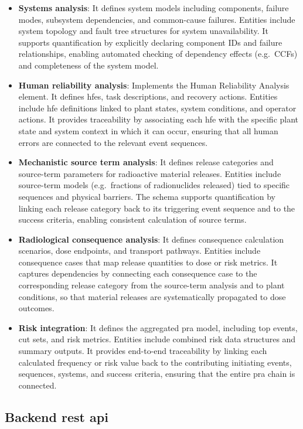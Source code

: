 \begin{itemize}
  \item \textbf{Systems analysis}: It defines system models including components, failure modes, subsystem dependencies, and common-cause failures.  Entities include system topology and fault tree structures for system unavailability.  It supports quantification by explicitly declaring component IDs and failure relationships, enabling automated checking of dependency effects (e.g.\ CCFs) and completeness of the system model.
  \item \textbf{Human reliability analysis}: Implements the Human Reliability Analysis element.  It defines \acrfull{hfe}s, task descriptions, and recovery actions.  Entities include \acrshort{hfe} definitions linked to plant states, system conditions, and operator actions.  It provides traceability by associating each \acrshort{hfe} with the specific plant state and system context in which it can occur, ensuring that all human errors are connected to the relevant event sequences.
  \item \textbf{Mechanistic source term analysis}: It defines release categories and source-term parameters for radioactive material releases.  Entities include source-term models (e.g.\ fractions of radionuclides released) tied to specific sequences and physical barriers.  The schema supports quantification by linking each release category back to its triggering event sequence and to the success criteria, enabling consistent calculation of source terms.
  \item \textbf{Radiological consequence analysis}: It defines consequence calculation scenarios, dose endpoints, and transport pathways.  Entities include consequence cases that map release quantities to dose or risk metrics.  It captures dependencies by connecting each consequence case to the corresponding release category from the source-term analysis and to plant conditions, so that material releases are systematically propagated to dose outcomes.
  \item \textbf{Risk integration}: It defines the aggregated \acrshort{pra} model, including top events, cut sets, and risk metrics.  Entities include combined risk data structures and summary outputs.  It provides end-to-end traceability by linking each calculated frequency or risk value back to the contributing initiating events, sequences, systems, and success criteria, ensuring that the entire \acrshort{pra} chain is connected.
\end{itemize}

\subsection{Backend \acrshort{rest} \acrshort{api}}

